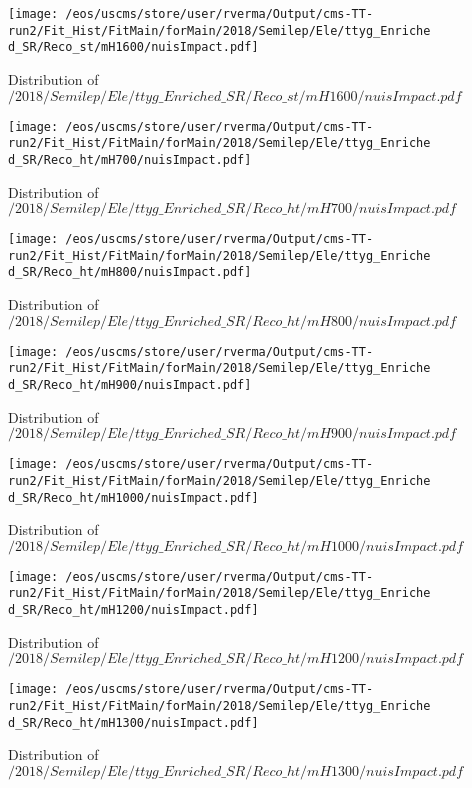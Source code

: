 \begin{figure}
\centering
\texttt{[image: /eos/uscms/store/user/rverma/Output/cms-TT-run2/Fit\_Hist/FitMain/forMain/2018/Semilep/Ele/ttyg\_Enriched\_SR/Reco\_st/mH1600/nuisImpact.pdf]}
\caption{Distribution of $/2018/Semilep/Ele/ttyg\_Enriched\_SR/Reco\_st/mH1600/nuisImpact.pdf$}
\end{figure}

\begin{figure}
\centering
\texttt{[image: /eos/uscms/store/user/rverma/Output/cms-TT-run2/Fit\_Hist/FitMain/forMain/2018/Semilep/Ele/ttyg\_Enriched\_SR/Reco\_ht/mH700/nuisImpact.pdf]}
\caption{Distribution of $/2018/Semilep/Ele/ttyg\_Enriched\_SR/Reco\_ht/mH700/nuisImpact.pdf$}
\end{figure}

\begin{figure}
\centering
\texttt{[image: /eos/uscms/store/user/rverma/Output/cms-TT-run2/Fit\_Hist/FitMain/forMain/2018/Semilep/Ele/ttyg\_Enriched\_SR/Reco\_ht/mH800/nuisImpact.pdf]}
\caption{Distribution of $/2018/Semilep/Ele/ttyg\_Enriched\_SR/Reco\_ht/mH800/nuisImpact.pdf$}
\end{figure}

\begin{figure}
\centering
\texttt{[image: /eos/uscms/store/user/rverma/Output/cms-TT-run2/Fit\_Hist/FitMain/forMain/2018/Semilep/Ele/ttyg\_Enriched\_SR/Reco\_ht/mH900/nuisImpact.pdf]}
\caption{Distribution of $/2018/Semilep/Ele/ttyg\_Enriched\_SR/Reco\_ht/mH900/nuisImpact.pdf$}
\end{figure}

\begin{figure}
\centering
\texttt{[image: /eos/uscms/store/user/rverma/Output/cms-TT-run2/Fit\_Hist/FitMain/forMain/2018/Semilep/Ele/ttyg\_Enriched\_SR/Reco\_ht/mH1000/nuisImpact.pdf]}
\caption{Distribution of $/2018/Semilep/Ele/ttyg\_Enriched\_SR/Reco\_ht/mH1000/nuisImpact.pdf$}
\end{figure}

\begin{figure}
\centering
\texttt{[image: /eos/uscms/store/user/rverma/Output/cms-TT-run2/Fit\_Hist/FitMain/forMain/2018/Semilep/Ele/ttyg\_Enriched\_SR/Reco\_ht/mH1200/nuisImpact.pdf]}
\caption{Distribution of $/2018/Semilep/Ele/ttyg\_Enriched\_SR/Reco\_ht/mH1200/nuisImpact.pdf$}
\end{figure}

\begin{figure}
\centering
\texttt{[image: /eos/uscms/store/user/rverma/Output/cms-TT-run2/Fit\_Hist/FitMain/forMain/2018/Semilep/Ele/ttyg\_Enriched\_SR/Reco\_ht/mH1300/nuisImpact.pdf]}
\caption{Distribution of $/2018/Semilep/Ele/ttyg\_Enriched\_SR/Reco\_ht/mH1300/nuisImpact.pdf$}
\end{figure}

